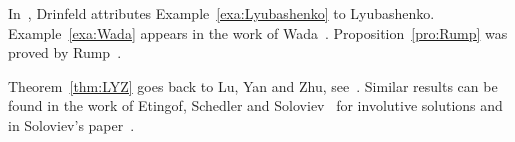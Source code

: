 In~\cite{MR1183474}, Drinfeld attributes Example~\ref{exa:Lyubashenko} to 
Lyubashenko. Example~\ref{exa:Wada} 
appears in the work of Wada~\cite{MR1167178}. Proposition~\ref{pro:Rump} 
was proved by Rump~\cite{MR2278047}. 

Theorem~\ref{thm:LYZ} goes back to Lu, Yan and Zhu, see~\cite{MR1769723}.
Similar results can be found in the work of Etingof, Schedler and Soloviev~\cite{MR1722951} for involutive solutions and 
in Soloviev's paper~\cite{MR1809284}. 

